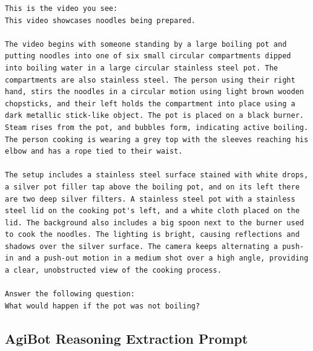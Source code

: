 \begin{tcolorbox}[colback=nvidiagreen!3,colframe=nvidiagreen!75!white,title=\textsc{Physical Common Sense Reasoning Extraction Prompt},left=0.5ex,right=0.5ex,top=0.5ex,bottom=0.5ex]
\fontsize{9.}{9.}\selectfont
\begin{Verbatim}[breaklines=true, breaksymbolleft={}, breaksymbolright={}]
This is the video you see:
This video showcases noodles being prepared. 

The video begins with someone standing by a large boiling pot and putting noodles into one of six small circular compartments dipped into boiling water in a large circular stainless steel pot. The compartments are also stainless steel. The person using their right hand, stirs the noodles in a circular motion using light brown wooden chopsticks, and their left holds the compartment into place using a dark metallic stick-like object. The pot is placed on a black burner. Steam rises from the pot, and bubbles form, indicating active boiling. The person cooking is wearing a grey top with the sleeves reaching his elbow and has a rope tied to their waist.

The setup includes a stainless steel surface stained with white drops, a silver pot filler tap above the boiling pot, and on its left there are two deep silver filters. A stainless steel pot with a stainless steel lid on the cooking pot's left, and a white cloth placed on the lid. The background also includes a big spoon next to the burner used to cook the noodles. The lighting is bright, causing reflections and shadows over the silver surface. The camera keeps alternating a push-in and a push-out motion in a medium shot over a high angle, providing a clear, unobstructed view of the cooking process.

Answer the following question:
What would happen if the pot was not boiling?
\end{Verbatim}
\label{prompt:commonsense_reasoning_extraction}
\end{tcolorbox}


\subsection{AgiBot Reasoning Extraction Prompt}


